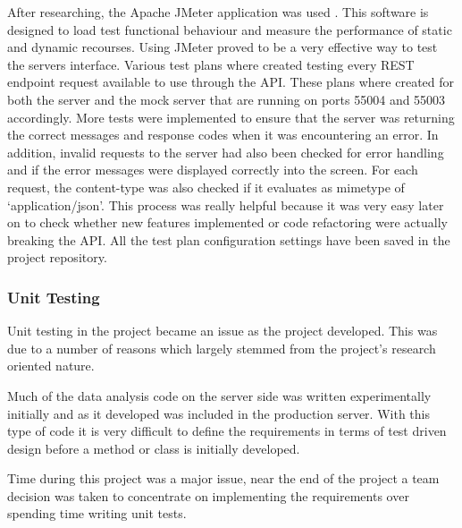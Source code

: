 After researching, the Apache JMeter application was used \cite{ApacheJmeter}. This software is designed to load test 
functional behaviour and measure the performance of static and dynamic recourses. Using JMeter 
proved to be a very effective way to test the servers interface. Various test plans where created 
testing every REST endpoint request available to use through the API. These plans where created for 
both the server and the mock server that are running on ports 55004 and 55003 accordingly. More 
tests were implemented to ensure that the server was returning the correct messages and response 
codes when it was encountering an error. In addition, invalid requests to the server had also been 
checked for error handling and if the error messages were displayed correctly into the screen. For 
each request, the content-type was also checked if it evaluates as mimetype of `application/json'. This process was really 
helpful because it was very easy later on to check whether new features implemented or code 
refactoring were actually breaking the API. All the test plan configuration settings have been saved 
in the project repository. 

\subsubsection{Unit Testing} 
Unit testing in the project became an issue as the project developed. This was
due to a number of reasons which largely stemmed from the project's research
oriented nature.

Much of the data analysis code on the server side was written experimentally
initially and as it developed was included in the production server. With this
type of code it is very difficult to define the requirements in terms of test
driven design before a method or class is initially developed.

Time during this project was a major issue, near the end of the project a team
decision was taken to concentrate on implementing the requirements over
spending time writing unit tests.
